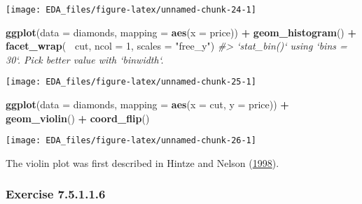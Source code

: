 \documentclass[]{book}
\newenvironment{Shaded}{\begin{snugshade}}{\end{snugshade}}
\newcommand{\CommentTok}[1]{\textcolor[rgb]{0.56,0.35,0.01}{\textit{#1}}}
\newcommand{\DataTypeTok}[1]{\textcolor[rgb]{0.13,0.29,0.53}{#1}}
\newcommand{\DecValTok}[1]{\textcolor[rgb]{0.00,0.00,0.81}{#1}}
\newcommand{\KeywordTok}[1]{\textcolor[rgb]{0.13,0.29,0.53}{\textbf{#1}}}
\newcommand{\NormalTok}[1]{#1}
\newcommand{\OperatorTok}[1]{\textcolor[rgb]{0.81,0.36,0.00}{\textbf{#1}}}
\newcommand{\StringTok}[1]{\textcolor[rgb]{0.31,0.60,0.02}{#1}}
\theoremstyle{plain}
\theoremstyle{remark}
\begin{document}
\begin{center}\texttt{[image: EDA\_files/figure-latex/unnamed-chunk-24-1]} \end{center}

\begin{Shaded}
\begin{Highlighting}[]
\KeywordTok{ggplot}\NormalTok{(}\DataTypeTok{data =}\NormalTok{ diamonds, }\DataTypeTok{mapping =} \KeywordTok{aes}\NormalTok{(}\DataTypeTok{x =}\NormalTok{ price)) }\OperatorTok{+}
\StringTok{  }\KeywordTok{geom_histogram}\NormalTok{() }\OperatorTok{+}
\StringTok{  }\KeywordTok{facet_wrap}\NormalTok{(}\OperatorTok{~}\StringTok{ }\NormalTok{cut, }\DataTypeTok{ncol =} \DecValTok{1}\NormalTok{, }\DataTypeTok{scales =} \StringTok{"free_y"}\NormalTok{)}
\CommentTok{#> `stat_bin()` using `bins = 30`. Pick better value with `binwidth`.}
\end{Highlighting}
\end{Shaded}

\begin{center}\texttt{[image: EDA\_files/figure-latex/unnamed-chunk-25-1]} \end{center}

\begin{Shaded}
\begin{Highlighting}[]
\KeywordTok{ggplot}\NormalTok{(}\DataTypeTok{data =}\NormalTok{ diamonds, }\DataTypeTok{mapping =} \KeywordTok{aes}\NormalTok{(}\DataTypeTok{x =}\NormalTok{ cut, }\DataTypeTok{y =}\NormalTok{ price)) }\OperatorTok{+}
\StringTok{  }\KeywordTok{geom_violin}\NormalTok{() }\OperatorTok{+}
\StringTok{  }\KeywordTok{coord_flip}\NormalTok{()}
\end{Highlighting}
\end{Shaded}

\begin{center}\texttt{[image: EDA\_files/figure-latex/unnamed-chunk-26-1]} \end{center}

The violin plot was first described in Hintze and Nelson
(\protect\hyperlink{ref-HintzeNelson1998}{1998}).

\hypertarget{exercise-7.5.1.1.6}{%
\subsubsection*{\texorpdfstring{Exercise
{7.5.1.1.6}}{Exercise 7.5.1.1.6}}\label{exercise-7.5.1.1.6}}
\end{document}
